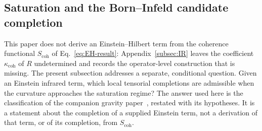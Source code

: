 \subsection{Saturation and the Born--Infeld candidate completion}
  \label{subsec:stepB-BI}

  This paper does not derive an Einstein--Hilbert term from the coherence functional
  $S_{\mathrm{coh}}$ of Eq.~\eqref{eq:EH-result}: Appendix~\ref{subsec:IR} leaves the coefficient
  $\kappa_{\mathrm{coh}}$ of $R$ undetermined and records the operator-level construction that is missing.
  The present subsection addresses a separate, conditional question.
  Given an Einstein infrared term, which local tensorial completions are admissible when the curvature approaches
  the saturation regime?
  The answer used here is the classification of the companion gravity paper~\cite{Beau2026h}, restated with its
  hypotheses.
  It is a statement about the completion of a supplied Einstein term, not a derivation of that term, or of its
  completion, from $S_{\mathrm{coh}}$.

